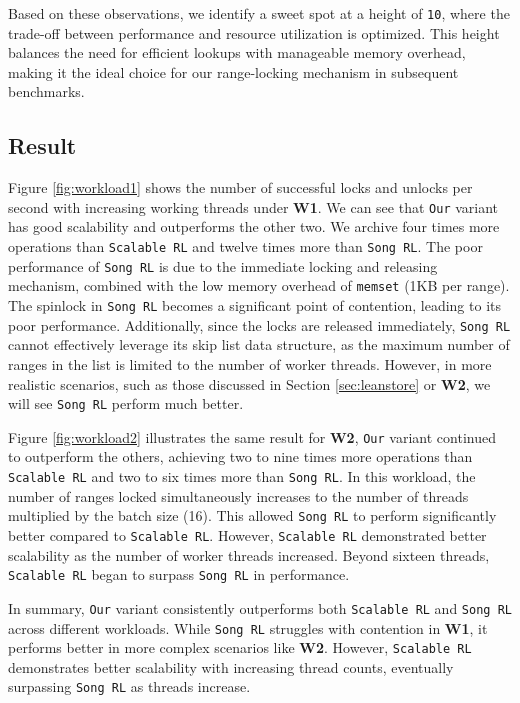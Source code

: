 Based on these observations, we identify a sweet spot at a height of \texttt{10}, where the trade-off between performance and resource utilization is optimized. 
This height balances the need for efficient lookups with manageable memory overhead, making it the ideal choice for our range-locking mechanism in subsequent benchmarks.

\subsection{Result}

Figure \ref{fig:workload1} shows the number of successful locks and unlocks per second with increasing working threads under \textbf{W1}. We can see that \texttt{Our} variant has good scalability and outperforms the other two. We archive four times more operations than \texttt{Scalable RL} and twelve times more than \texttt{Song RL}. The poor performance of \texttt{Song RL} is due to the immediate locking and releasing mechanism, combined with the low memory overhead of \texttt{memset} (1KB per range). The spinlock in \texttt{Song RL} becomes a significant point of contention, leading to its poor performance. Additionally, since the locks are released immediately, \texttt{Song RL} cannot effectively leverage its skip list data structure, as the maximum number of ranges in the list is limited to the number of worker threads. However, in more realistic scenarios, such as those discussed in Section \ref{sec:leanstore} or \textbf{W2}, we will see \texttt{Song RL} perform much better.

Figure \ref{fig:workload2} illustrates the same result for \textbf{W2}, \texttt{Our} variant continued to outperform the others, achieving two to nine times more operations than \texttt{Scalable RL} and two to six times more than \texttt{Song RL}. 
In this workload, the number of ranges locked simultaneously increases to the number of threads multiplied by the batch size (16). 
This allowed \texttt{Song RL} to perform significantly better compared to \texttt{Scalable RL}. 
However, \texttt{Scalable RL} demonstrated better scalability as the number of worker threads increased. Beyond sixteen threads, \texttt{Scalable RL} began to surpass \texttt{Song RL} in performance.

In summary, \texttt{Our} variant consistently outperforms both \texttt{Scalable RL} and \texttt{Song RL} across different workloads. 
While \texttt{Song RL} struggles with contention in \textbf{W1}, it performs better in more complex scenarios like \textbf{W2}. 
However, \texttt{Scalable RL} demonstrates better scalability with increasing thread counts, eventually surpassing \texttt{Song RL} as threads increase.

